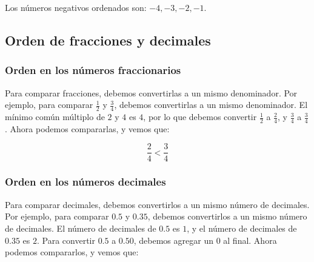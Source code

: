 Los números negativos ordenados son: $-4, -3, -2, -1$.

\subsection{Orden de fracciones y decimales}

\subsubsection{Orden en los n\'umeros fraccionarios}
Para comparar fracciones, debemos convertirlas a un mismo denominador. Por ejemplo, para comparar $\frac{1}{2}$ y $\frac{3}{4}$, debemos convertirlas a un mismo denominador. El mínimo común múltiplo de $2$ y $4$ es $4$, por lo que debemos convertir $\frac{1}{2}$ a $\frac{2}{4}$, y $\frac{3}{4}$ a $\frac{3}{4}$. Ahora podemos compararlas, y vemos que:

\[\frac{2}{4}<\frac{3}{4}\]

\begin{center}
\end{center}

\subsubsection{Orden en los n\'umeros decimales}

Para comparar decimales, debemos convertirlos a un mismo número de decimales. Por ejemplo, para comparar $0.5$ y $0.35$, debemos convertirlos a un mismo número de decimales. El número de decimales de $0.5$ es $1$, y el número de decimales de $0.35$ es $2$. Para convertir $0.5$ a $0.50$, debemos agregar un $0$ al final. Ahora podemos compararlos, y vemos que:


